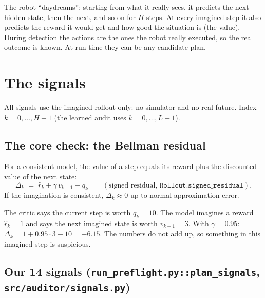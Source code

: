 \documentclass[11pt]{article}
\newcommand{\code}[1]{\texttt{#1}}
\begin{document}
\begin{inwords}
The robot ``daydreams'': starting from what it really sees, it predicts the next hidden state, then the next, and
so on for $H$ steps. At every imagined step it also predicts the reward it would get and how good the situation is
(the value). During detection the actions are the ones the robot really executed, so the real outcome is known.
At run time they can be any candidate plan.
\end{inwords}

\section{The signals}\label{sec:signals}

All signals use the imagined rollout only: no simulator and no real future. Index $k=0,\dots,H-1$ (the learned
audit uses $k=0,\dots,L-1$).

\subsection{The core check: the Bellman residual}

For a consistent model, the value of a step equals its reward plus the discounted value of the next state:
\[
\Delta_k \;=\; \hat r_k+\gamma\,v_{k+1}-q_k \qquad(\text{signed residual, }\code{Rollout.signed\_residual}).
\]
If the imagination is consistent, $\Delta_k\approx0$ up to normal approximation error.

\begin{example}
The critic says the current step is worth $q_k=10$. The model imagines a reward $\hat r_k=1$ and says the next
imagined state is worth $v_{k+1}=3$. With $\gamma=0.95$: $\Delta_k=1+0.95\cdot3-10=-6.15$. The numbers do not add up,
so something in this imagined step is suspicious.
\end{example}

\subsection{Our 14 signals (\code{run\_preflight.py::plan\_signals}, \code{src/auditor/signals.py})}
\end{document}
